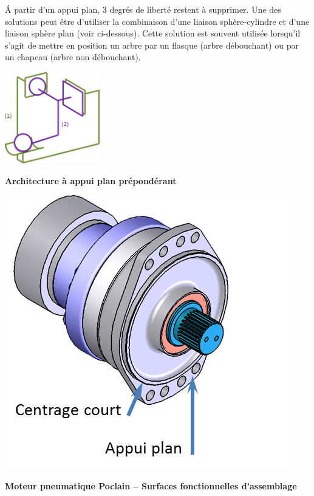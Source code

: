 \documentclass[11pt,oneside]{article}
\begin{document}
\'A partir d'un appui plan, 3 degrés de liberté restent à supprimer. Une des solutions peut être d'utiliser la combinaison d'une liaison sphère-cylindre et d'une liaison sphère plan (voir ci-dessous). Cette solution est souvent utilisée lorsqu'il s'agit de mettre en position un arbre par un flasque (arbre débouchant) ou par un chapeau (arbre non débouchant).


\noindent\begin{minipage}[c]{.45\linewidth}
\begin{center}
\includegraphics[height=4cm]{png/archi2}

\textbf{Architecture à appui plan prépondérant}
\end{center}
\end{minipage}\hfill
\noindent\begin{minipage}[c]{.45\linewidth}
\begin{center}
\includegraphics[width=.8\textwidth]{png/poclain_2}

\textbf{Moteur pneumatique Poclain \cite{poclain} -- Surfaces fonctionnelles d'assemblage}
\end{center}
\end{minipage}
\end{document}
